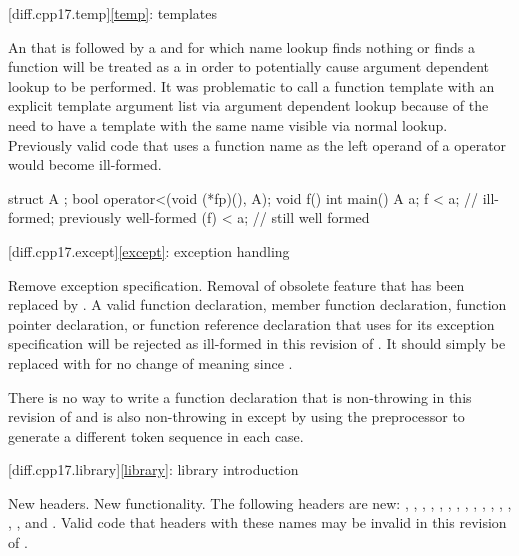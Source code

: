 [diff.cpp17.temp]{\ref{temp}: templates}

\change
An 
that is followed by a \tcode{<}
and for which name lookup
finds nothing or finds a function
will be treated as a 
in order to potentially cause argument dependent lookup to be performed.
\rationale
It was problematic to call a function template
with an explicit template argument list
via argument dependent lookup
because of the need to have a template with the same name
visible via normal lookup.
\effect
Previously valid code that uses a function name
as the left operand of a \tcode{<} operator
would become ill-formed.
\begin{codeblock}
struct A {};
bool operator<(void (*fp)(), A);
void f() {}
int main() {
  A a;
  f < a;    // ill-formed; previously well-formed
  (f) < a;  // still well formed
}
\end{codeblock}

[diff.cpp17.except]{\ref{except}: exception handling}

\change
Remove  exception specification.
\rationale
Removal of obsolete feature that has been replaced by .
\effect
A valid \CppXVII{} function declaration, member function declaration, function
pointer declaration, or function reference declaration that uses 
for its exception specification will be rejected as ill-formed in this
revision of \Cpp{}. It should simply be replaced with  for no
change of meaning since \CppXVII{}.
\begin{note}
There is no way to write a function declaration
that is non-throwing in this revision of \Cpp{}
and is also non-throwing in \CppIII{}
except by using the preprocessor to generate
a different token sequence in each case.
\end{note}

[diff.cpp17.library]{\ref{library}: library introduction}

\change
New headers.
\rationale
New functionality.
\effect
The following \Cpp{} headers are new:
,
,
,
,
,
,
,
,
,
,
,
,
,
,
, and
.
Valid \CppXVII{} code that  headers with these names may be
invalid in this revision of \Cpp{}.

